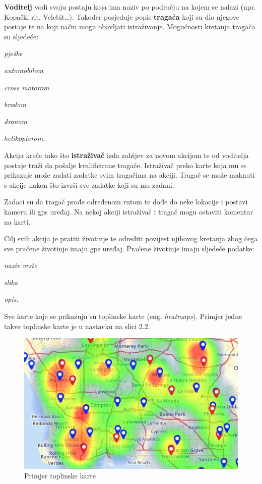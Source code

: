 		
		
		\textbf{Voditelj} vodi svoju postaju koja ima naziv po području na kojem se nalazi (npr. Kopački rit, Velebit…). Također posjeduje popis \textbf{tragača} koji su dio njegove postaje te na koji način mogu obavljati istraživanje. Mogućnosti kretanja tragača su sljedeće:
		\begin{packed_item}
			\item \textit{pješke}
			\item \textit{automobilom}
			\item \textit{cross motorom}
			\item \textit{brodom}
			\item \textit{dronom}
			\item \textit{helikopterom.}
		\end{packed_item}
		
		Akcija kreće tako što \textbf{istraživač} izda zahtjev za novom akcijom te od voditelja postaje traži da pošalje kvalificirane tragače. Istraživač preko karte koja mu se prikazuje može zadati zadatke svim tragačima na akciji. Tragač se može maknuti s akcije nakon što izvrši sve zadatke koji su mu zadani.
		
		Zadaci su da tragač prođe određenom rutom te dođe do neke lokacije i postavi kameru ili gps uređaj. Na nekoj akciji istraživač i tragač mogu ostaviti komentar na karti.
		
		Cilj svih akcija je pratiti životinje te odrediti povijest njihovog kretanja zbog čega sve praćene životinje imaju gps uređaj. Praćene životinje imaju sljedeće podatke:
		\begin{packed_item}
			\item \textit{naziv vrste}
			\item \textit{slika}
			\item \textit{opis.}
		\end{packed_item}
		
		Sve karte koje se prikazuju su toplinske karte (eng. \textit{heatmaps}). Primjer jedne takve toplinske karte je u nastavku na slici 2.2.
		
		\begin{figure}[H]
			\includegraphics[scale=0.8]{slike/heatmap.JPG} %
			\centering
			\caption{Primjer toplinske karte}
			\label{fig:prkarte} %
		\end{figure}
		
